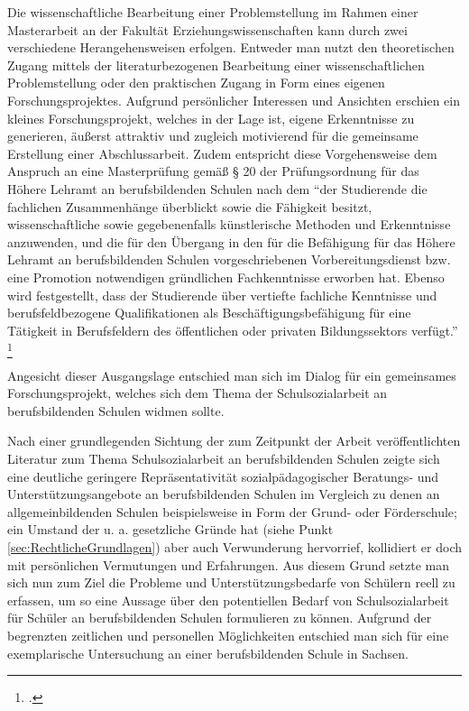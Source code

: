 Die wissenschaftliche Bearbeitung einer Problemstellung im Rahmen einer Masterarbeit an der Fakultät Erziehungswissenschaften kann durch zwei verschiedene Herangehensweisen erfolgen. Entweder man nutzt den theoretischen Zugang mittels der literaturbezogenen Bearbeitung einer wissenschaftlichen Problemstellung oder den praktischen Zugang in Form eines eigenen Forschungsprojektes.
Aufgrund persönlicher Interessen und Ansichten erschien ein kleines Forschungsprojekt, welches in der Lage ist, eigene Erkenntnisse zu generieren, äußerst attraktiv und zugleich motivierend für die gemeinsame Erstellung einer Abschlussarbeit. Zudem entspricht diese Vorgehensweise dem Anspruch an eine Masterprüfung gemäß § 20 der Prüfungsordnung für das Höhere Lehramt an berufsbildenden Schulen nach dem "`der Studierende die fachlichen Zusammenhänge überblickt sowie die Fähigkeit besitzt, wissenschaftliche sowie gegebenenfalls künstlerische Methoden und Erkenntnisse anzuwenden, und die für den Übergang in den für die Befähigung für das Höhere Lehramt an berufsbildenden Schulen vorgeschriebenen Vorbereitungsdienst bzw. eine Promotion notwendigen gründlichen Fachkenntnisse erworben hat. Ebenso wird festgestellt, dass der Studierende über vertiefte fachliche Kenntnisse und berufsfeldbezogene Qualifikationen als Beschäftigungsbefähigung für eine Tätigkeit in Berufsfeldern des öffentlichen oder privaten Bildungssektors verfügt."' \footcite[13]{TUDresden2010}

Angesicht dieser Ausgangslage entschied man sich im Dialog für ein gemeinsames Forschungsprojekt, welches sich dem Thema der Schulsozialarbeit an berufsbildenden Schulen widmen sollte. 

Nach einer grundlegenden Sichtung der zum Zeitpunkt der Arbeit veröffentlichten Literatur zum Thema Schulsozialarbeit an berufsbildenden Schulen zeigte sich eine deutliche geringere Repräsentativität sozialpädagogischer Beratungs- und Unterstützungsangebote an berufsbildenden Schulen im Vergleich zu denen an allgemeinbildenden Schulen beispielsweise in Form der Grund- oder Förderschule; ein Umstand der u. a. gesetzliche Gründe hat (siehe Punkt \ref{sec:RechtlicheGrundlagen}) aber auch Verwunderung hervorrief, kollidiert er doch mit persönlichen Vermutungen und Erfahrungen. Aus diesem Grund setzte man sich nun zum Ziel die Probleme und Unterstützungsbedarfe von Schülern reell zu erfassen, um so eine Aussage über den potentiellen Bedarf von Schulsozialarbeit für Schüler an berufsbildenden Schulen formulieren zu können. Aufgrund der begrenzten zeitlichen und personellen Möglichkeiten entschied man sich für eine exemplarische Untersuchung an einer berufsbildenden Schule in Sachsen.
 

